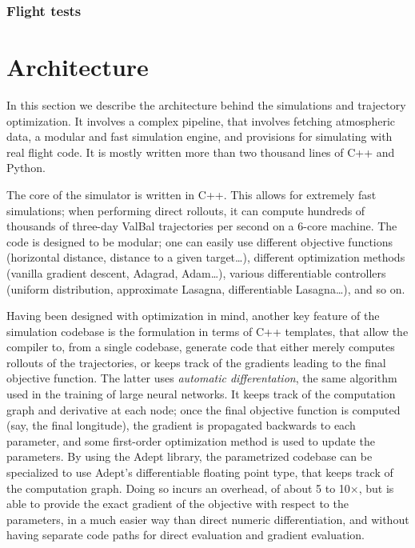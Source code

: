 \documentclass[11pt]{scrartcl} %
\begin{document}
\subsubsection{Flight tests}


\newpage
\section{Architecture}
\label{arch}
In this section we describe the architecture behind the simulations and trajectory optimization. It involves a complex pipeline, that involves fetching atmospheric data, a modular and fast simulation engine, and provisions for simulating with real flight code. It is mostly written more than two thousand lines of C++ and Python.

The core of the simulator is written in C++. This allows for extremely fast simulations; when performing direct rollouts, it can compute hundreds of thousands of three-day ValBal trajectories per second on a 6-core machine. The code is designed to be modular; one can easily use different objective functions (horizontal distance, distance to a given target\dots), different optimization methods (vanilla gradient descent, Adagrad, Adam\dots), various differentiable controllers (uniform distribution, approximate Lasagna, differentiable Lasagna\dots), and so on.

Having been designed with optimization in mind, another key feature of the simulation codebase is the formulation in terms of C++ templates, that allow the compiler to, from a single codebase, generate code that either merely computes rollouts of the trajectories, or keeps track of the gradients leading to the final objective function. The latter uses \emph{automatic differentation}, the same algorithm used in the training of large neural networks. It keeps track of the computation graph and derivative at each node; once the final objective function is computed (say, the final longitude), the gradient is propagated backwards to each parameter, and some first-order optimization method is used to update the parameters. By using the Adept library, the parametrized codebase can be specialized to use Adept's differentiable floating point type, that keeps track of the computation graph. Doing so incurs an overhead, of about 5 to 10$\times$, but is able to provide the exact gradient of the objective with respect to the parameters, in a much easier way than direct numeric differentiation, and without having separate code paths for direct evaluation and gradient evaluation.
\end{document}
